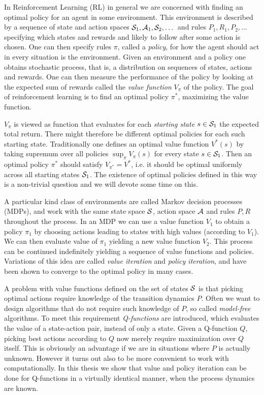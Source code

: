 
In Reinforcement Learning (RL) in general
we are concerned with finding an optimal policy
for an agent in some environment.
This environment is described by
a sequence of state and action spaces
$\mathcal{S}_1, \mathcal{A}_1, \mathcal{S}_2, \dots$
and rules $P_1, R_1, P_2, \dots$ specifying which states and rewards
and likely to follow after some action is chosen.
One can then specify rules $\pi$, called a \emph{policy},
for how the agent should act in every situation is the environment.
Given an environment and a policy one obtains stochastic process,
that is, a distribution on sequences of states, actions and
rewards.
One can then measure the performance of the policy by looking at
the expected sum of rewards called the \emph{value function}
$V_\pi$ of the policy.
The goal of reinforcement learning is to find an optimal policy $\pi^*$,
maximizing the value function.

$V_\pi$ is viewed as function that evaluates for each \emph{starting state}
$s \in \mathcal{S}_1$ the expected total return.
There might therefore be different optimal policies for each such starting
state.
Traditionally one defines an optimal value function $V^*(s)$
by taking supremum over all policies $\sup_\pi V_\pi(s)$ for every state
$s \in \mathcal{S}_1$.
Then an optimal policy $\pi^*$ should satisfy $V_{\pi^*} = V^*$,
i.e. it should be optimal uniformly across all starting states $\mathcal{S}_1$.
The existence of optimal policies defined in this way is a non-trivial
question and we will devote some time on this.

A particular kind class of environments are called Markov decision processes
(MDPs),
and work with the same state space $\mathcal{S}$, action space $\mathcal{A}$ and rules
$P, R$ throughout the process.
In an MDP we can use a value function $V_1$ to obtain a policy $\pi_1$
by choosing actions
leading to states with high values (according to $V_1$).
We can then evaluate value of $\pi_1$ yielding a new value function $V_2$.
This process can be continued indefinitely yielding a sequence of value
functions and policies.
Variations of this idea are called \emph{value iteration} and
\emph{policy iteration}, and have been shown to converge to the optimal
policy in many cases.

A problem with value functions defined on the set of states $\mathcal{S}$ is that
picking optimal actions require knowledge of the transition dynamics $P$.
Often we want to design algorithms that do not require such knowledge of $P$,
so called \emph{model-free} algorithms.
To meet this requirement \emph{Q-functions} are introduced, which evaluates
the value of a state-action pair, instead of only a state.
Given a Q-function $Q$, picking best actions according to $Q$ now
merely require maximization over $Q$ itself.
This is obviously an advantage if we are in situations where $P$ is actually
unknown. %
However it turns out also to be more convenient to work with computationally.
In this thesis we show that value and policy iteration can be done
for Q-functions in a virtually identical manner, when the process dynamics
are known.


